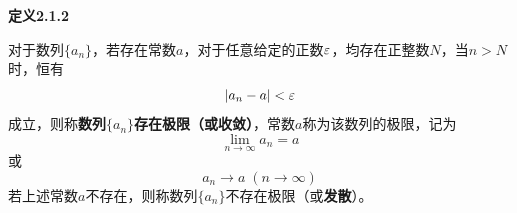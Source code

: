 {\bf 定义2.1.2} 

对于数列$\{a_n\}$，若存在常数$a$，对于任意给定的正数$\varepsilon$，均存在正整数$N$，当$n>N$时，恒有
$$|a_n-a|<\varepsilon$$
成立，则称{\bf 数列$\{a_n\}$存在极限（或收敛）}，常数$a$称为该数列的极限，记为
$$\lim_{n\to\infty}a_n=a$$
或
$$a_n\to a\;(n\to\infty)$$
若上述常数$a$不存在，则称数列$\{a_n\}$不存在极限（或{\bf 发散}）。

\begin{center}
	\quad
	

\end{center}
